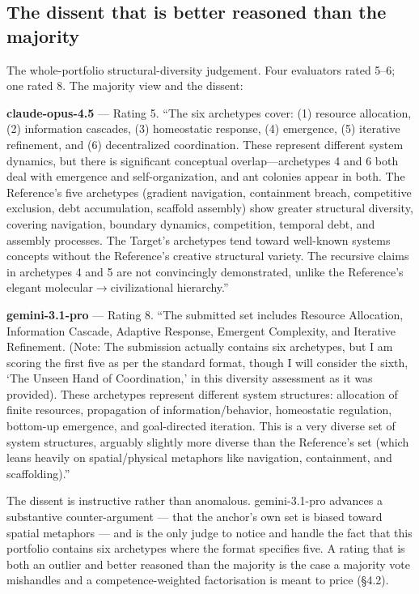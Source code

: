\documentclass{article}
\begin{document}
\subsection{The dissent that is better reasoned than the majority}\label{the-dissent-that-is-better-reasoned-than-the-majority}

The whole-portfolio structural-diversity judgement. Four evaluators rated 5--6; one rated 8. The majority view and the dissent:

\textbf{claude-opus-4.5} --- Rating 5. ``The six archetypes cover: (1) resource allocation, (2) information cascades, (3) homeostatic response, (4) emergence, (5) iterative refinement, and (6) decentralized coordination. These represent different system dynamics, but there is significant conceptual overlap---archetypes 4 and 6 both deal with emergence and self-organization, and ant colonies appear in both. The Reference's five archetypes (gradient navigation, containment breach, competitive exclusion, debt accumulation, scaffold assembly) show greater structural diversity, covering navigation, boundary dynamics, competition, temporal debt, and assembly processes. The Target's archetypes tend toward well-known systems concepts without the Reference's creative structural variety. The recursive claims in archetypes 4 and 5 are not convincingly demonstrated, unlike the Reference's elegant molecular\ensuremath{\rightarrow}civilizational hierarchy.''

\textbf{gemini-3.1-pro} --- Rating 8. ``The submitted set includes Resource Allocation, Information Cascade, Adaptive Response, Emergent Complexity, and Iterative Refinement. (Note: The submission actually contains six archetypes, but I am scoring the first five as per the standard format, though I will consider the sixth, `The Unseen Hand of Coordination,' in this diversity assessment as it was provided). These archetypes represent different system structures: allocation of finite resources, propagation of information/behavior, homeostatic regulation, bottom-up emergence, and goal-directed iteration. This is a very diverse set of system structures, arguably slightly more diverse than the Reference's set (which leans heavily on spatial/physical metaphors like navigation, containment, and scaffolding).''

The dissent is instructive rather than anomalous. gemini-3.1-pro advances a substantive counter-argument --- that the anchor's own set is biased toward spatial metaphors --- and is the only judge to notice and handle the fact that this portfolio contains six archetypes where the format specifies five. A rating that is both an outlier and better reasoned than the majority is the case a majority vote mishandles and a competence-weighted factorisation is meant to price (\S{}4.2).
\end{document}
